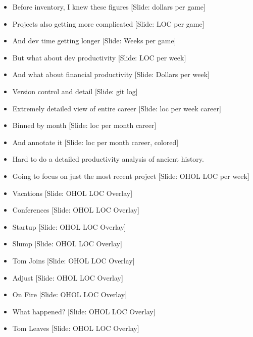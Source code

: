 \documentclass[12pt]{article}
\begin{document}
{\begin{itemize}
\item Before inventory, I knew these figures [Slide: dollars per game]

\item Projects also getting more complicated [Slide: LOC per game]


\item And dev time getting longer [Slide: Weeks per game]

\item But what about dev productivity [Slide: LOC per week]

\item And what about financial productivity [Slide: Dollars per week]

\item Version control and detail [Slide: git log]

\item Extremely detailed view of entire career  [Slide: loc per week career]

\item Binned by month  [Slide: loc per month career]

\item And annotate it  [Slide: loc per month career, colored]

\item Hard to do a detailed productivity analysis of ancient history.

\item Going to focus on just the most recent project [Slide:  OHOL LOC per week]

\item Vacations [Slide: OHOL LOC Overlay]

\item Conferences [Slide: OHOL LOC Overlay]

\item Startup [Slide: OHOL LOC Overlay]

\item Slump [Slide: OHOL LOC Overlay]

\item Tom Joins [Slide: OHOL LOC Overlay]

\item Adjust [Slide: OHOL LOC Overlay]

\item On Fire [Slide: OHOL LOC Overlay]

\item What happened? [Slide: OHOL LOC Overlay]

\item Tom Leaves [Slide: OHOL LOC Overlay]


\end{itemize}}
\end{document}
